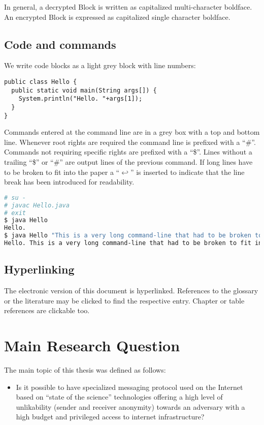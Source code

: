 In general, a decrypted Block is written as capitalized multi-character boldface. An encrypted Block is expressed as capitalized single character boldface.

\section{Code and commands}
We write code blocks as a light grey block with line numbers:

\begin{lstlisting}
public class Hello {
  public static void main(String args[]) {
    System.println("Hello. "+args[1]);
  }
}
\end{lstlisting}

Commands entered at the command line are in a grey box with a top and bottom line. Whenever root rights are required the command line is prefixed with a ``\#''. Commands not requiring specific rights are prefixed with a ``\$''. Lines without a trailing ``\$'' or ``\#'' are output lines of the previous command. If long lines have to be broken to fit into the paper a ``$\hookleftarrow$'' is inserted to indicate that the line break has been introduced for readability.

\begin{lstlisting}[language=bash]
# su -
# javac Hello.java 
# exit
$ java Hello
Hello.
$ java Hello "This is a very long command-line that had to be broken to fit into the code box displayed on this page."
Hello. This is a very long command-line that had to be broken to fit into the code box displayed on this page.
\end{lstlisting}

\section{Hyperlinking}
The electronic version of this document is hyperlinked. References to the glossary or the literature may be clicked to find the respective entry. Chapter or table references are clickable too. 

\chapter{Main Research Question}
The main topic of this thesis was defined as follows:
\begin{itemize}
	\item Is it possible to have specialized messaging protocol used on the Internet based on ``state of the science'' technologies offering a high level of unlikability (sender and receiver anonymity) towards an adversary with a high budget and privileged access to internet infrastructure?
\end{itemize}

